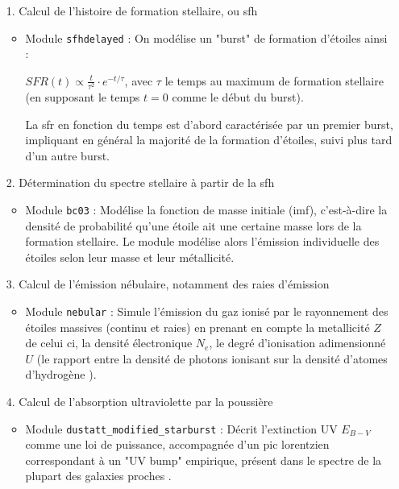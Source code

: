 \documentclass[11pt, a4paper]{article}
\begin{document}
\begin{itemize}
  \item[1.] Calcul de l'histoire de formation stellaire, ou \gls{sfh}
  \begin{itemize}
    \item Module \texttt{sfhdelayed} : On modélise un "burst" de formation d'étoiles ainsi :
    
     $SFR(t) \propto \frac{t}{\tau^2} \cdot e^{-t/\tau}$, avec $\tau$ le temps au maximum de formation stellaire (en supposant le temps $t=0$ comme le début du burst).

    La \gls{sfr} en fonction du temps est d'abord caractérisée par un premier burst, impliquant en général la majorité de la formation d'étoiles, suivi plus tard d'un autre burst.
  \end{itemize}

  \item[2.] Détermination du spectre stellaire à partir de la \gls{sfh}
  \begin{itemize}
    \item Module \texttt{bc03} : Modélise la fonction de masse initiale (\gls{imf}), c'est-à-dire la densité de probabilité qu'une étoile ait une certaine masse lors de la formation stellaire. Le module modélise alors l'émission individuelle des étoiles selon leur masse et leur métallicité.
  \end{itemize}

  \item[3.] Calcul de l'émission nébulaire, notamment des raies d'émission
  \begin{itemize}
    \item Module \texttt{nebular} : Simule l'émission du gaz ionisé par le rayonnement des étoiles massives (continu et raies) en prenant en compte la metallicité $Z$ de celui ci, la densité électronique $N_e$, le degré d'ionisation adimensionné $U$ (le rapport entre la densité de photons ionisant sur la densité d'atomes d'hydrogène \parencite{Astrophysics-of-the-Diffuse-Universe}).
  \end{itemize}

  \item[4.] Calcul de l'absorption ultraviolette par la poussière
  \begin{itemize}
    \item Module \texttt{dustatt\_modified\_starburst} : Décrit l'extinction UV $E_{B-V}$ comme une loi de puissance, accompagnée d'un pic lorentzien correspondant à un "UV bump" empirique, présent dans le spectre de la plupart des galaxies proches \parencite{10.1093/mnras/stac1313}.
  \end{itemize}


\end{itemize}
\end{document}

